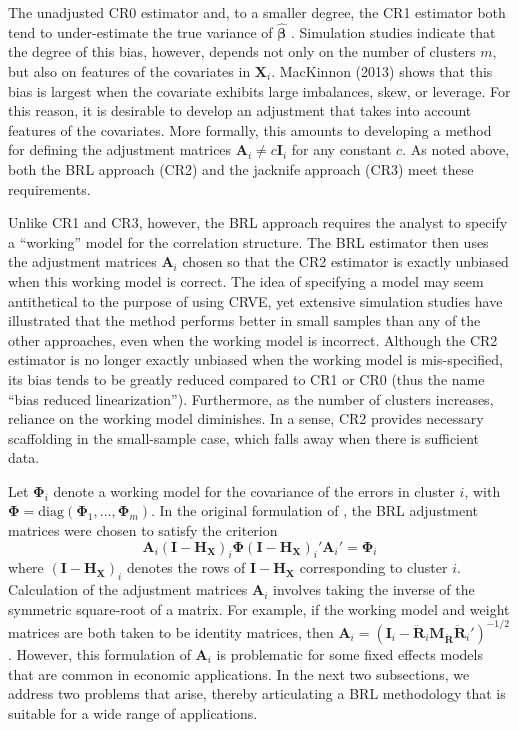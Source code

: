 \documentclass[12pt]{article}\usepackage[]{graphicx}\usepackage[]{color}
\newcommand{\bm}{\mathbf}
\newcommand{\bs}{\boldsymbol}
\begin{document}
The unadjusted CR0 estimator and, to a smaller degree, the CR1 estimator both tend to under-estimate the true variance of $\hat{\bs\beta}$ \citep{Cameron2015practitioners}. Simulation studies indicate that the degree of this bias, however, depends not only on the number of clusters $m$, but also on features of the covariates in $\bm{X}_i$. 
MacKinnon (2013) shows that this bias is largest when the covariate exhibits large imbalances, skew, or leverage. 
For this reason, it is desirable to develop an adjustment that takes into account features of the covariates. 
More formally, this amounts to developing a method for defining the adjustment matrices $\bm{A}_i \neq c \bm{I}_i$ for any constant $c$.
As noted above, both the BRL approach (CR2) and the jacknife approach (CR3) meet these requirements.

Unlike CR1 and CR3, however, the BRL approach requires the analyst to specify a ``working'' model for the correlation structure. The BRL estimator then uses the adjustment matrices $\bm{A}_i$ chosen so that the CR2 estimator is exactly unbiased when this working model is correct. 
The idea of specifying a model may seem antithetical to the purpose of using CRVE, yet extensive simulation studies have illustrated that the method performs better in small samples than any of the other approaches, even when the working model is incorrect. 
Although the CR2 estimator is no longer exactly unbiased when the working model is mis-specified, its bias tends to be greatly reduced compared to CR1 or CR0 (thus the name ``bias reduced linearization''). Furthermore, as the number of clusters increases, reliance on the working model diminishes. 
In a sense, CR2 provides necessary scaffolding in the small-sample case, which falls away when there is sufficient data.

Let $\bs\Phi_i$ denote a working model for the covariance of the errors in cluster $i$, with $\bs\Phi = \text{diag}\left(\bs\Phi_1,...,\bs\Phi_m\right)$. In the original formulation of \citet{Bell2002bias}, the BRL adjustment matrices were chosen to satisfy the criterion
\begin{equation}
\label{eq:CR2_criterion_BM}
\bm{A}_i \left(\bm{I} - \bm{H_X}\right)_i \bs\Phi \left(\bm{I} - \bm{H_X}\right)_i' \bm{A}_i'  =  \bs\Phi_i 
\end{equation}
where $\left(\bm{I} - \bm{H_X}\right)_i$ denotes the rows of $\bm{I} - \bm{H_X}$ corresponding to cluster $i$.
Calculation of the adjustment matrices $\bm{A}_i$ involves taking the inverse of the symmetric square-root of a matrix. 
For example, if the working model and weight matrices are both taken to be identity matrices, then $\bm{A}_i = \left(\bm{I}_i - \bm{\ddot{R}}_i\bm{M_{\ddot{R}}} \bm{\ddot{R}}_i'\right)^{-1/2}$. 
However, this formulation of $\bm{A}_i$ is problematic for some fixed effects models that are common in economic applications. 
In the next two subsections, we address two problems that arise, thereby articulating a BRL methodology that is suitable for a wide range of applications.
\end{document}
